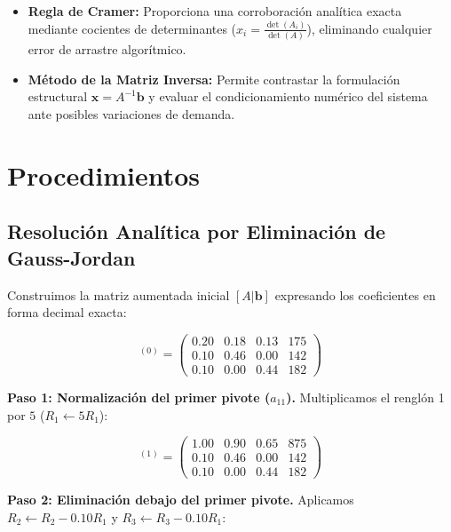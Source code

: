 \begin{enumerate}
\begin{itemize}
        \item \textbf{Regla de Cramer:} Proporciona una corroboración analítica exacta mediante cocientes de determinantes ($x_i = \frac{\det(A_i)}{\det(A)}$), eliminando cualquier error de arrastre algorítmico.

        \item \textbf{Método de la Matriz Inversa:} Permite contrastar la formulación estructural $\mathbf{x} = A^{-1}\mathbf{b}$ y evaluar el condicionamiento numérico del sistema ante posibles variaciones de demanda.

    \end{itemize}

\end{enumerate}

\section{Procedimientos}

\subsection{Resolución Analítica por Eliminación de Gauss-Jordan}

Construimos la matriz aumentada inicial $[A|\mathbf{b}]$ expresando los coeficientes en forma decimal exacta:

\begin{equation}
[A|\mathbf{b}]^{(0)} =
\left(\begin{array}{ccc|c}
0.20 & 0.18 & 0.13 & 175 \\
0.10 & 0.46 & 0.00 & 142 \\
0.10 & 0.00 & 0.44 & 182
\end{array}\right)
\end{equation}

\noindent\textbf{Paso 1: Normalización del primer pivote ($a_{11}$).} Multiplicamos el renglón 1 por $5$ ($R_1 \leftarrow 5 R_1$):

\begin{equation}
[A|\mathbf{b}]^{(1)} =
\left(\begin{array}{ccc|c}
1.00 & 0.90 & 0.65 & 875 \\
0.10 & 0.46 & 0.00 & 142 \\
0.10 & 0.00 & 0.44 & 182
\end{array}\right)
\end{equation}

\noindent\textbf{Paso 2: Eliminación debajo del primer pivote.} Aplicamos $R_2 \leftarrow R_2 - 0.10 R_1$ y $R_3 \leftarrow R_3 - 0.10 R_1$:

